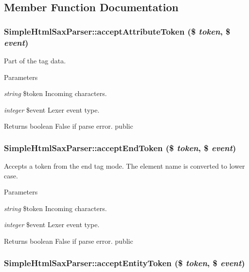 \subsection{Member Function Documentation}
\hypertarget{class_simple_html_sax_parser_a7a7c562dc219fe6471d41779878ab75b}{
\subsubsection[{acceptAttributeToken}]{\setlength{\rightskip}{0pt plus 5cm}SimpleHtmlSaxParser::acceptAttributeToken (\$ {\em token}, \/  \$ {\em event})}}
\label{class_simple_html_sax_parser_a7a7c562dc219fe6471d41779878ab75b}
Part of the tag data. 
\begin{DoxyParams}{Parameters}
\item[{\em string}]\$token Incoming characters. \item[{\em integer}]\$event Lexer event type. \end{DoxyParams}
\begin{DoxyReturn}{Returns}
boolean False if parse error.  public 
\end{DoxyReturn}
\hypertarget{class_simple_html_sax_parser_a3f7e6bfe6467157a454c508770f7a91c}{
\subsubsection[{acceptEndToken}]{\setlength{\rightskip}{0pt plus 5cm}SimpleHtmlSaxParser::acceptEndToken (\$ {\em token}, \/  \$ {\em event})}}
\label{class_simple_html_sax_parser_a3f7e6bfe6467157a454c508770f7a91c}
Accepts a token from the end tag mode. The element name is converted to lower case. 
\begin{DoxyParams}{Parameters}
\item[{\em string}]\$token Incoming characters. \item[{\em integer}]\$event Lexer event type. \end{DoxyParams}
\begin{DoxyReturn}{Returns}
boolean False if parse error.  public 
\end{DoxyReturn}
\hypertarget{class_simple_html_sax_parser_a64e03cc7d6ee88bf887fc835271f7520}{
\subsubsection[{acceptEntityToken}]{\setlength{\rightskip}{0pt plus 5cm}SimpleHtmlSaxParser::acceptEntityToken (\$ {\em token}, \/  \$ {\em event})}}
